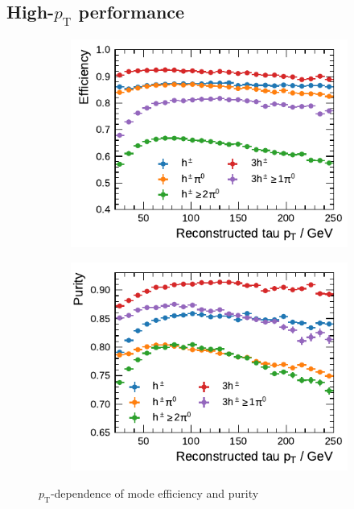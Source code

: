 \subsection{High-$p_\text{T}$ performance}
\begin{figure}[htb]
  \begin{subfigure}{0.48\textwidth}
    \centering
    \includegraphics{./figures/decay_mode_classification/highpt/efficiency_profile.pdf}
  \end{subfigure}\hfill
  \begin{subfigure}{0.48\textwidth}
    \centering
    \includegraphics{./figures/decay_mode_classification/highpt/purity_profile.pdf}
  \end{subfigure}
  \caption{$p_\text{T}$-dependence of mode efficiency and purity}
  \label{fig:mode_efficiency_purity_highpt}
\end{figure}

